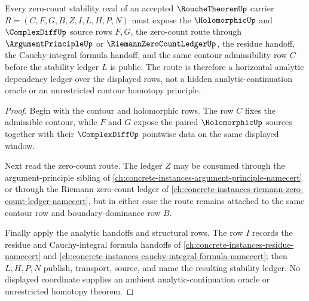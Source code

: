 \begin{theorem}
\label{thm:rouche-theorem-holomorphic-route}
Every zero-count stability read of an accepted $\RoucheTheoremUp$ carrier $R=(C,F,G,B,Z,I,L,H,P,N)$ must expose the $\HolomorphicUp$ and $\ComplexDiffUp$ source rows $F,G$, the zero-count route through $\ArgumentPrincipleUp$ or $\RiemannZeroCountLedgerUp$, the residue handoff, the Cauchy-integral formula handoff, and the same contour admissibility row $C$ before the stability ledger $L$ is public. The route is therefore a horizontal analytic dependency ledger over the displayed rows, not a hidden analytic-continuation oracle or an unrestricted contour homotopy principle.
\end{theorem}
\begin{proof}
Begin with the contour and holomorphic rows. The row $C$ fixes the admissible contour, while $F$ and $G$ expose the paired $\HolomorphicUp$ sources together with their $\ComplexDiffUp$ pointwise data on the same displayed window.

Next read the zero-count route. The ledger $Z$ may be consumed through the argument-principle sibling of \autoref{ch:concrete-instances-argument-principle-namecert} or through the Riemann zero-count ledger of \autoref{ch:concrete-instances-riemann-zero-count-ledger-namecert}, but in either case the route remains attached to the same contour row and boundary-dominance row $B$.

Finally apply the analytic handoffs and structural rows. The row $I$ records the residue and Cauchy-integral formula handoffs of \autoref{ch:concrete-instances-residue-namecert} and \autoref{ch:concrete-instances-cauchy-integral-formula-namecert}; then $L,H,P,N$ publish, transport, source, and name the resulting stability ledger. No displayed coordinate supplies an ambient analytic-continuation oracle or unrestricted homotopy theorem.
\end{proof}


